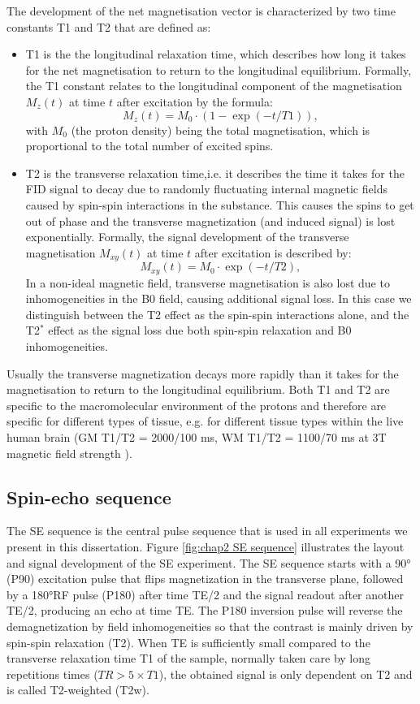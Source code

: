The development of the net magnetisation vector is characterized by two time constants T1 and T2 that are defined as:  
\begin{itemize}
	\item T1 is the the longitudinal relaxation time, which describes how long it takes for the net magnetisation to return to the longitudinal equilibrium. Formally, the T1 constant relates to the longitudinal component of the magnetisation $M_z(t)$ at time $t$ after excitation by the formula:
	\begin{equation}
		M_z(t) = M_0 \cdot (1-\exp(-t/T1)),
	\end{equation} 
	with $M_0$ (the proton density) being the total magnetisation, which is proportional to the total number of excited spins. 
	\item T2 is the transverse relaxation time,i.e. it describes the time it takes for the FID signal to decay due to randomly fluctuating internal magnetic fields caused by spin-spin interactions in the substance. This causes the spins to get out of phase and the transverse magnetization (and induced signal) is lost exponentially. Formally, the signal development of the transverse magnetisation $M_{xy}(t)$ at time $t$ after excitation is described by:
	\begin{equation}
		M_{xy}(t) = M_0 \cdot \exp(-t/T2),
	\end{equation} 	
	In a non-ideal magnetic field, transverse magnetisation is also lost due to inhomogeneities in the B0 field, causing additional signal loss. In this case we distinguish between the T2 effect as the spin-spin interactions alone, and the T2$^*$ effect as the signal loss due both spin-spin relaxation and B0 inhomogeneities.
\end{itemize}

Usually the transverse magnetization decays more rapidly than it takes for the magnetisation to return to the longitudinal equilibrium. Both T1 and T2 are specific to the macromolecular environment of the protons and therefore are specific for different types of tissue, e.g. for different tissue types within the live human brain (\gls{GM} T1/T2 = 2000/100 ms, \gls{WM} T1/T2 = 1100/70 ms at 3T magnetic field strength \citep{Stanisz:2005}).
\subsection*{Spin-echo sequence}
The {\gls{SE}} sequence is the central pulse sequence that is used in all experiments we present in this dissertation. Figure \ref{fig:chap2 SE sequence} illustrates the layout and signal development of the \gls{SE} experiment. The \gls{SE} sequence starts with a 90°(P90) excitation pulse that flips magnetization in the transverse plane, followed by a 180°RF pulse (P180) after time TE/2 and the signal readout after another TE/2, producing an echo at time TE. The P180 inversion pulse will reverse the demagnetization by field inhomogeneities so that the contrast is mainly driven by spin-spin relaxation (T2). When TE is sufficiently small compared to the transverse relaxation time T1 of the sample, normally taken care by long repetitions times ($TR>5\times T1 $), the obtained signal is only dependent on T2 and is called T2-weighted (T2w). 

